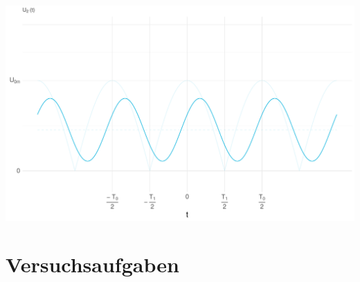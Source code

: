 \documentclass[a4paper, 12pt]{article}
\begin{document}
    \vspace{0.021276873\paperheight}
    \begin{center}
      \includegraphics[scale=0.5]{./R/2_3/2_3_function.pdf}
    \end{center}



\pagebreak
\section{Versuchsaufgaben}
\end{document}
